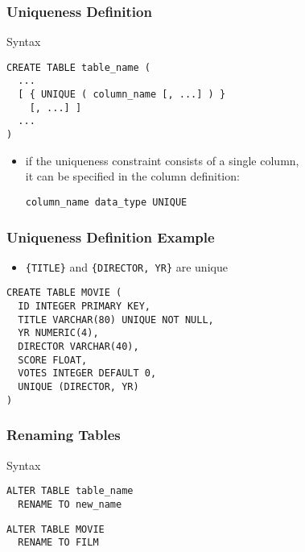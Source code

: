 \documentclass[dvipsnames]{beamer}
\theoremstyle{plain}
\begin{document}
\begin{frame}[fragile]
  \frametitle{Uniqueness Definition}

  \begin{block}{Syntax}
    \begin{lstlisting}
CREATE TABLE table_name (
  ...
  [ { UNIQUE ( column_name [, ...] ) }
    [, ...] ]
  ...
)
    \end{lstlisting}
  \end{block}

  \begin{itemize}
    \item if the uniqueness constraint consists of a single column,\\
      it can be specified in the column definition:
      \begin{lstlisting}
column_name data_type UNIQUE
      \end{lstlisting}
  \end{itemize}
\end{frame}

\begin{frame}[fragile]
  \frametitle{Uniqueness Definition Example}

  \begin{example}
    \begin{itemize}
      \item \texttt{\{TITLE\}} and \texttt{\{DIRECTOR, YR\}} are unique
    \end{itemize}

    \begin{lstlisting}
CREATE TABLE MOVIE (
  ID INTEGER PRIMARY KEY,
  TITLE VARCHAR(80) UNIQUE NOT NULL,
  YR NUMERIC(4),
  DIRECTOR VARCHAR(40),
  SCORE FLOAT,
  VOTES INTEGER DEFAULT 0,
  UNIQUE (DIRECTOR, YR)
)
    \end{lstlisting}
  \end{example}
\end{frame}

\begin{frame}[fragile]
  \frametitle{Renaming Tables}

  \begin{block}{Syntax}
    \begin{lstlisting}
ALTER TABLE table_name
  RENAME TO new_name
    \end{lstlisting}
  \end{block}

  \medskip
  \begin{example}
    \begin{lstlisting}
ALTER TABLE MOVIE
  RENAME TO FILM
    \end{lstlisting}
  \end{example}
\end{frame}
\end{document}
